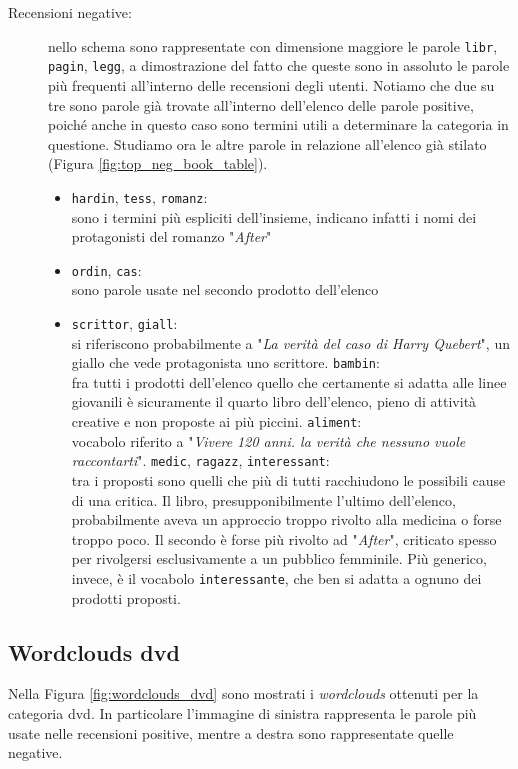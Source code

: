 \begin{description}
					\item[Recensioni negative:] 
					nello schema sono rappresentate con dimensione maggiore le parole \verb|libr|, \verb|pagin|, \verb|legg|, a dimostrazione del fatto che queste sono in assoluto le parole più frequenti all'interno delle recensioni degli utenti. Notiamo che due su tre sono parole già trovate all'interno dell'elenco delle parole positive, poiché anche in questo caso sono termini utili a determinare la categoria in questione. Studiamo ora le altre parole in relazione all'elenco già stilato (Figura \ref{fig:top_neg_book_table}).
					
					\begin{itemize}
						\item \texttt{hardin}, \texttt{tess}, \texttt{romanz}: \\
						sono i termini più espliciti dell'insieme, indicano infatti i nomi dei protagonisti del romanzo "\textit{After}"
						\item \texttt{ordin}, \texttt{cas}:\\
						sono parole usate nel secondo prodotto dell'elenco 
						\item \texttt{scrittor}, \texttt{giall}:\\
						si riferiscono probabilmente a "\textit{La verità del caso di Harry Quebert}", un giallo che vede protagonista uno scrittore.
						\texttt{bambin}: \\
						fra tutti i prodotti dell'elenco quello che certamente si adatta alle linee giovanili è sicuramente il quarto libro dell'elenco, pieno di attività creative e non proposte ai più piccini.
						\texttt{aliment}: \\
						vocabolo riferito a "\textit{Vivere 120 anni. la verità che nessuno vuole raccontarti}".
						\texttt{medic}, \texttt{ragazz}, \texttt{interessant}: \\
						tra i proposti sono quelli che più di tutti racchiudono le possibili cause di una critica. Il libro, presupponibilmente l'ultimo dell'elenco, probabilmente aveva un approccio troppo rivolto alla medicina o forse troppo poco. Il secondo è forse più rivolto ad "\textit{After}", criticato spesso per rivolgersi esclusivamente a un pubblico femminile. Più generico, invece, è il vocabolo \verb|interessante|, che ben si adatta a ognuno dei prodotti proposti.												
					\end{itemize}
				\end{description}
			
			
			\subsection{Wordclouds dvd}
				Nella Figura \ref{fig:wordclouds_dvd} sono mostrati i \textit{wordclouds} ottenuti per la categoria dvd. In particolare l'immagine di sinistra rappresenta le parole più usate nelle recensioni positive, mentre a destra sono rappresentate quelle negative. 
					

